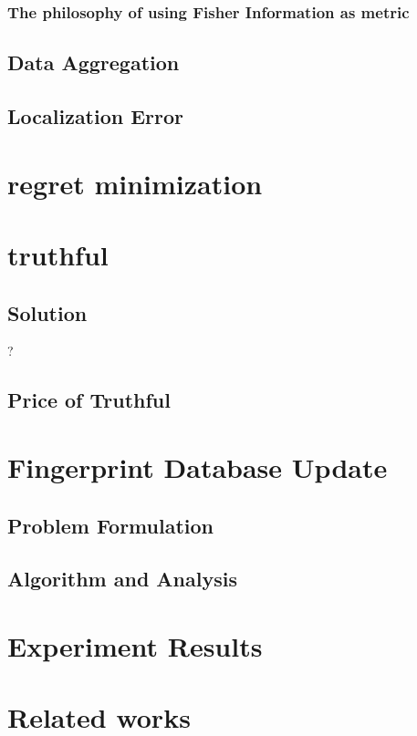 \documentclass[journal]{IEEEtran}
\begin{document}
\subsubsection{The philosophy of using Fisher Information as metric}

\subsection{Data Aggregation}%

\subsection{Localization Error}

\section{regret minimization}

\section{truthful}

\subsection{Solution}
?
\subsection{Price of Truthful}


\section{Fingerprint Database Update}

\subsection{Problem Formulation}

\subsection{Algorithm and Analysis}

\section{Experiment Results}

\section{Related works}
\end{document}
